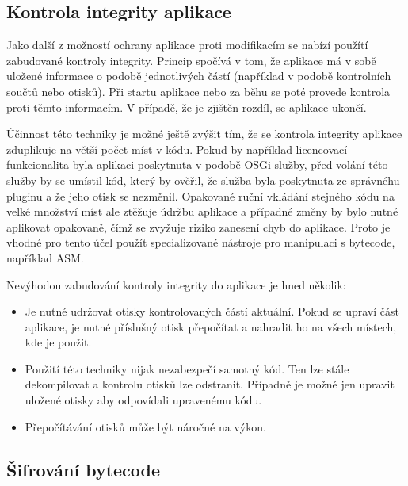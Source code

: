\subsection{Kontrola integrity aplikace}

Jako další z možností ochrany aplikace proti modifikacím se nabízí použítí
zabudované kontroly integrity. Princip spočívá v tom, že aplikace má v sobě
uložené informace o podobě jednotlivých částí (například v podobě
kontrolních součtů nebo otisků). Při startu aplikace nebo za běhu se poté
provede kontrola proti těmto informacím. V případě, že je zjištěn rozdíl, se
aplikace ukončí.

Účinnost této techniky je možné ještě zvýšit tím, že se kontrola integrity
aplikace zduplikuje na větší počet míst v kódu. Pokud by například licencovací
funkcionalita byla aplikaci poskytnuta v podobě \gls{OSGi} služby, před volání
této služby by se umístil kód, který by ověřil, že služba byla poskytnuta ze
správnéhu pluginu a že jeho otisk se nezměnil. Opakované ruční vkládání stejného
kódu na velké množství míst ale ztěžuje údržbu aplikace a případné změny by bylo
nutné aplikovat opakovaně, čímž se zvyžuje riziko zanesení chyb do aplikace.
Proto je vhodné pro tento účel použít specializované nástroje pro manipulaci s
bytecode, například ASM\cite{asm}.

Nevýhodou zabudování kontroly integrity do aplikace je hned několik:
\begin{itemize}
  \item Je nutné udržovat otisky kontrolovaných částí aktuální. Pokud se upraví
  část aplikace, je nutné příslušný otisk přepočítat a nahradit ho na všech
  místech, kde je použit.
  \item Použití této techniky nijak nezabezpečí samotný kód. Ten lze stále
  dekompilovat a kontrolu otisků lze odstranit. Případně je možné jen upravit
  uložené otisky aby odpovídali upravenému kódu.
  \item Přepočítávání otisků může být náročné na výkon.
\end{itemize}

\subsection{Šifrování bytecode}




